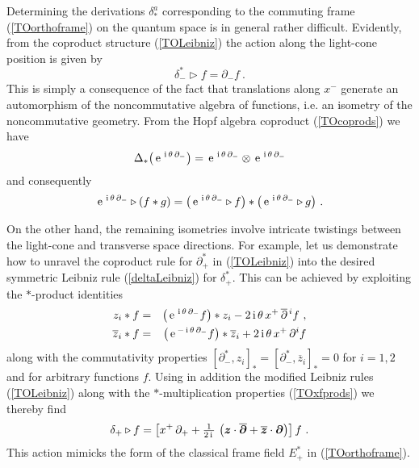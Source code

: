 \documentclass[11pt,a4paper]{article}
\def\nn{\nonumber}
\newcommand{\1}{\mathbb{1}}
\newcommand{\mbf}[1]{{\boldsymbol {#1} }}
\def\ii{{\,{\rm i}\,}}
\def\mz{{\mbf z}}
\def\mdell{{\mbf\partial}}
\def\nn{\nonumber}
\def\e{{\,\rm e}\,}
\begin{document}
Determining the derivations $\delta_*^a$ corresponding to the
commuting frame (\ref{TOorthoframe}) on the quantum space is in
general rather difficult. Evidently, from the coproduct structure
(\ref{TOLeibniz}) the action along the light-cone position is given by
\begin{equation}
\delta_-^*\triangleright f=\partial_-f \ .
\label{TOdeltaminus}\end{equation}
This is simply a consequence of the fact that translations along $x^-$
generate an automorphism of the noncommutative algebra of functions,
i.e. an isometry of the noncommutative geometry. From the Hopf algebra
coproduct (\ref{TOcoprods}) we have
\begin{equation}
\Delta_*\bigl(\e^{\ii\theta\,\partial_-}\bigr)=
\e^{\ii\theta\,\partial_-}\otimes\e^{\ii\theta\,\partial_-}
\label{TOcoprodglobal}\end{equation}
and consequently
\begin{equation}
\e^{\ii\theta\,\partial_-}\triangleright(f*g)=\bigl(
\e^{\ii\theta\,\partial_-}\triangleright f\bigr)*\bigl(
\e^{\ii\theta\,\partial_-}\triangleright g\bigr) \ .
\label{xmautoNC}\end{equation}

On the other hand, the remaining isometries involve intricate
twistings between the light-cone and transverse space directions. For
example, let us demonstrate how to unravel the coproduct rule for
$\partial_+^*$ in (\ref{TOLeibniz}) into the desired symmetric Leibniz
rule (\ref{deltaLeibniz}) for $\delta_+^*$. This can be achieved by
exploiting the $*$-product identities
\begin{eqnarray}
z_i*f&=&\bigl(\e^{\ii\theta\,\partial_-}f\bigr)*z_i-2\ii\theta\,
x^+\,\overline{\partial}{}^{\,i}f \ , \nn\\
\overline{z}_i*f&=&\bigl(\e^{-\ii\theta\,\partial_-}f\bigr)*
\overline{z}_i+2\ii\theta\,x^+\,\partial^if
\label{TOstarprodcomm}\end{eqnarray}
along with the commutativity properties
$[\partial_-^*,z_i]_*=[\partial_-^*,\overline{z}_i]_*=0$ for $i=1,2$
and for arbitrary functions $f$. Using in addition the modified
Leibniz rules (\ref{TOLeibniz}) along with the $*$-multiplication
properties (\ref{TOxfprods}) we thereby find
\begin{equation}
\delta_+\triangleright f=\left[x^+\,\partial_++\mbox{$\frac1{2\ii}$}\,
\left(\mz\cdot\overline{\mdell}+\overline{\mz}\cdot\mdell\right)
\right]f \ .
\label{TOdeltap}\end{equation}
This action mimicks the form of the classical frame field $E_+^*$ in
(\ref{TOorthoframe}).
\end{document}
